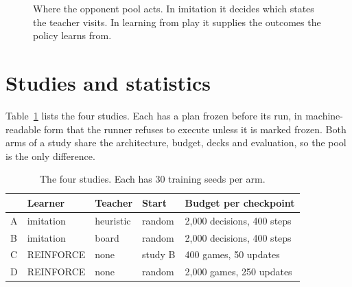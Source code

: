 \documentclass[conference]{IEEEtran}
\begin{document}
\begin{figure}[t]
\centering
{}
\caption{Where the opponent pool acts. In imitation it decides which states the teacher visits. In learning from play it supplies the outcomes the policy learns from.}
\label{fig:pool}
\end{figure}

\section{Studies and statistics}

Table~\ref{tab:design} lists the four studies. Each has a plan frozen before its run, in machine-readable form that the runner refuses to execute unless it is marked frozen. Both arms of a study share the architecture, budget, decks and evaluation, so the pool is the only difference.

\begin{table}[t]
\caption{The four studies. Each has 30 training seeds per arm.}
\label{tab:design}
\centering
\small
\setlength{\tabcolsep}{4pt}
\begin{tabular}{@{}lllll@{}}
\toprule
 & Learner & Teacher & Start & Budget per checkpoint \\
\midrule
A & imitation & heuristic & random & 2,000 decisions, 400 steps \\
B & imitation & board & random & 2,000 decisions, 400 steps \\
C & REINFORCE & none & study B & 400 games, 50 updates \\
D & REINFORCE & none & random & 2,000 games, 250 updates \\
\bottomrule
\end{tabular}
\end{table}
\end{document}
